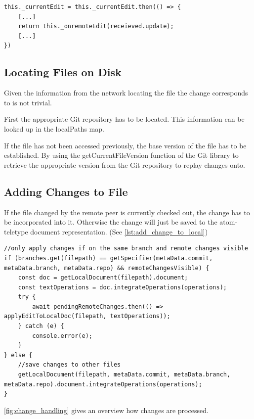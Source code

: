 \begin{lstlisting}[label={lst:promise_chain}, caption=Network Promise Chain]
this._currentEdit = this._currentEdit.then(() => {
    [...]
    return this._onremoteEdit(receieved.update);
    [...]
})
\end{lstlisting}

\subsection{Locating Files on Disk}

Given the information from the network locating the file the change corresponds to is not trivial.

First the appropriate Git repository has to be located.
This information can be looked up in the localPaths map.

If the file has not been accessed previously, the base version of the file has to be established.
By using the getCurrentFileVersion function of the Git library to retrieve the appropriate version from the Git repository to replay changes onto.

\subsection{Adding Changes to File}

If the file changed by the remote peer is currently checked out, the change has to be incorporated into it. Otherwise the change will just be saved to the atom-teletype document representation. (See \autoref{lst:add_change_to_local})

\begin{lstlisting}[label={lst:add_change_to_local}, caption=Adding Change to Local Document]
//only apply changes if on the same branch and remote changes visible
if (branches.get(filepath) == getSpecifier(metaData.commit, metaData.branch, metaData.repo) && remoteChangesVisible) {
    const doc = getLocalDocument(filepath).document;
    const textOperations = doc.integrateOperations(operations);
    try {
        await pendingRemoteChanges.then(() => applyEditToLocalDoc(filepath, textOperations));
    } catch (e) {
        console.error(e);
    }
} else {
    //save changes to other files
    getLocalDocument(filepath, metaData.commit, metaData.branch, metaData.repo).document.integrateOperations(operations);
}
\end{lstlisting}

\autoref{fig:change_handling} gives an overview how changes are processed.

